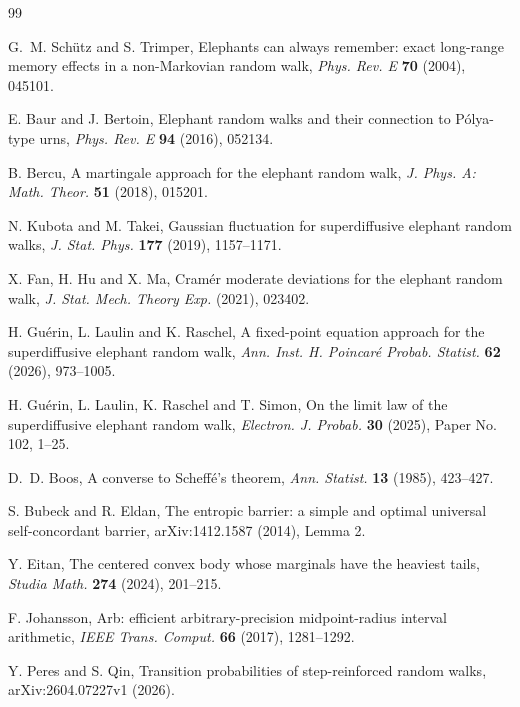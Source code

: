 \documentclass[11pt]{article}
\numberwithin{equation}{section}
\theoremstyle{remark}
\begin{document}
\begin{thebibliography}{99}
\raggedright
\setlength{\itemsep}{0.35em}

G.~M. Sch\"utz and S. Trimper,
\newblock Elephants can always remember: exact long-range memory effects in a
non-Markovian random walk,
\newblock \emph{Phys. Rev. E} \textbf{70} (2004), 045101.

E. Baur and J. Bertoin,
\newblock Elephant random walks and their connection to P\'olya-type urns,
\newblock \emph{Phys. Rev. E} \textbf{94} (2016), 052134.

B. Bercu,
\newblock A martingale approach for the elephant random walk,
\newblock \emph{J. Phys. A: Math. Theor.} \textbf{51} (2018), 015201.

N. Kubota and M. Takei,
\newblock Gaussian fluctuation for superdiffusive elephant random walks,
\newblock \emph{J. Stat. Phys.} \textbf{177} (2019), 1157--1171.

X. Fan, H. Hu and X. Ma,
\newblock Cram\'er moderate deviations for the elephant random walk,
\newblock \emph{J. Stat. Mech. Theory Exp.} (2021), 023402.

H. Gu\'erin, L. Laulin and K. Raschel,
\newblock A fixed-point equation approach for the superdiffusive elephant random
walk,
\newblock \emph{Ann. Inst. H. Poincar\'e Probab. Statist.} \textbf{62} (2026),
973--1005.

H. Gu\'erin, L. Laulin, K. Raschel and T. Simon,
\newblock On the limit law of the superdiffusive elephant random walk,
\newblock \emph{Electron. J. Probab.} \textbf{30} (2025), Paper No. 102, 1--25.

D.~D. Boos,
\newblock A converse to Scheff\'e's theorem,
\newblock \emph{Ann. Statist.} \textbf{13} (1985), 423--427.

S. Bubeck and R. Eldan,
\newblock The entropic barrier: a simple and optimal universal self-concordant
barrier,
\newblock arXiv:1412.1587 (2014), Lemma 2.

Y. Eitan,
\newblock The centered convex body whose marginals have the heaviest tails,
\newblock \emph{Studia Math.} \textbf{274} (2024), 201--215.

F. Johansson,
\newblock Arb: efficient arbitrary-precision midpoint-radius interval arithmetic,
\newblock \emph{IEEE Trans. Comput.} \textbf{66} (2017), 1281--1292.

Y. Peres and S. Qin,
\newblock Transition probabilities of step-reinforced random walks,
\newblock arXiv:2604.07227v1 (2026).

\end{thebibliography}
\end{document}
